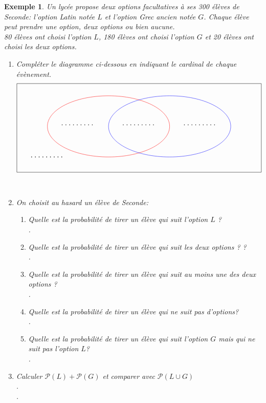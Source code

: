 \documentclass[a4paper,10.5pt]{article}
\newtheorem{ex}{Exemple}
\begin{document}
\begin{ex}
	Un lycée propose deux options facultatives à ses 300 élèves de Seconde: l'option Latin notée $L$ et l'option Grec ancien notée $G$. Chaque élève peut prendre une option, deux options ou bien aucune. \\
	80 élèves ont choisi l'option $L$, 180 élèves ont choisi l'option $G$ et 20 élèves ont choisi les deux options.\\ 
	\begin{enumerate}
	\item Compléter le diagramme ci-dessous en indiquant le cardinal de chaque évènement. 
		$$\begin{tikzpicture}[scale=1.5]
		\draw[red](-1,0) ellipse [x radius=2cm, y radius=1cm];
		\draw(-2,0.05) node{\large$\dots\dots\dots$};
		\draw(2,0.05) node{\large$\dots\dots\dots$};
		\draw(-3,-1) node[]{\large$\dots\dots\dots$};
		\draw(0,0.05) node{\large$\dots\dots\dots$};
		\draw[blue](1,0) ellipse [x radius=2cm, y radius=1cm];
		\draw[black](-4,-1.5) rectangle (4,1.4);
		\end{tikzpicture}$$ \hfil\\
		\item On choisit au hasard un élève de Seconde: \\[0.5cm]
		\begin{enumerate}
			\item Quelle est la probabilité de tirer un élève qui suit l'option $L$ ?\\[0.5cm]
			.\dotfill \\[0.15cm]
			\item Quelle est la probabilité de tirer un élève qui suit les deux options ? ?\\[0.5cm]
			.\dotfill \\[0.15cm]
			\item Quelle est la probabilité de tirer un élève qui suit au moins une des deux options ?\\[0.5cm]
			.\dotfill \\[0.15cm]
			\item Quelle est la probabilité de tirer un élève qui ne suit pas d'options? \\[0.5cm].\dotfill \\[0.15cm]
			\item Quelle est la probabilité de tirer un élève qui suit l'option $G$ mais qui ne suit pas l'option $L$? \\[0.5cm]
			.\dotfill \\[0.15cm]
		\end{enumerate}
	\item Calculer $\mathcal{P}(L) + \mathcal{P}(G)$ et comparer avec  $\mathcal{P}(L\cup G) $\\[0.15cm].\dotfill \\[0.15cm].\dotfill \\[0.15cm]
		
	\end{enumerate} 
\end{ex}
\end{document}
